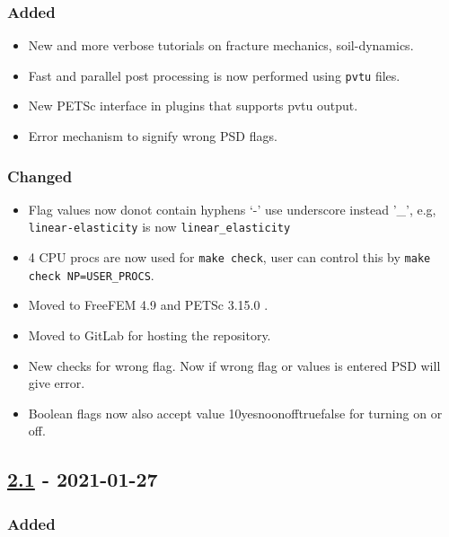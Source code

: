 \subsubsection{Added}

\begin{itemize}
\tightlist
\item
  New and more verbose tutorials on fracture mechanics, soil-dynamics.
\item
  Fast and parallel post processing is now performed using
  \lstinline!pvtu! files.
\item
  New PETSc interface in plugins that supports pvtu output.
\item
  Error mechanism to signify wrong PSD flags.
\end{itemize}

\subsubsection{Changed}

\begin{itemize}
\tightlist
\item
  Flag values now donot contain hyphens `-' use underscore instead '\_',
  e.g, \lstinline!linear-elasticity! is now
  \lstinline!linear_elasticity!
\item
  4 CPU procs are now used for \lstinline!make check!, user can control
  this by \lstinline!make check NP=USER_PROCS!.
\item
  Moved to FreeFEM 4.9 and PETSc 3.15.0 .
\item
  Moved to GitLab for hosting the repository.
\item
  New checks for wrong flag. Now if wrong flag or values is entered PSD
  will give error.
\item
  Boolean flags now also accept value
  1\textbar{}0\textbar{}yes\textbar{}no\textbar{}on\textbar{}off\textbar{}true\textbar{}false
  for turning on or off.
\end{itemize}

\subsection{\texorpdfstring{\href{https://gitlab.com/PsdSolver/psd_sources/-/tree/v2.1}{2.1}
- 2021-01-27}{2.1 - 2021-01-27}}

\subsubsection{Added}


